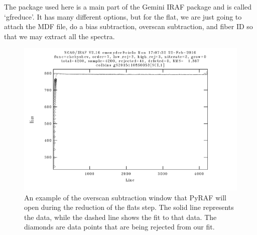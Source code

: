 \documentclass[12pt]{report}
\begin{document}
The package used here is a main part of the Gemini IRAF package and is called `gfreduce'. It has many different options, but for the flat, we are just going to attach the MDF file, do a bias subtraction, overscan subtraction, and fiber ID so that we may extract all the spectra.

\begin{figure}[h]
\centering
\includegraphics{overscan_example}
\caption[Overscan Subtraction Example]{An example of the overscan subtraction window that PyRAF will open during the reduction of the flats step. The solid line represents the data, while the dashed line shows the fit to that data. The diamonds are data points that are being rejected from our fit.}
\label{fig:overscan}
\end{figure}
\end{document}
